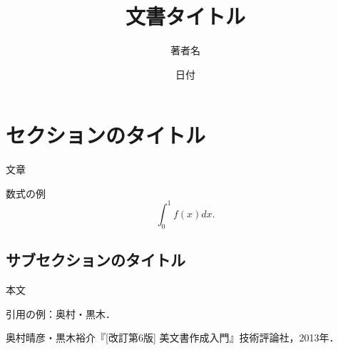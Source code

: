 \documentclass[11pt,a4j,fleqn]{jarticle}
\title{文書タイトル}
\author{著者名}
\date{日付}
\begin{document}
\maketitle

\section{セクションのタイトル}
文章

数式の例
\[
\int_0^1 f(x) dx.
\]

\subsection{サブセクションのタイトル}

本文

引用の例：奥村・黒木\cite{OkumuraKuroki13}．


\begin{thebibliography}{0}
奥村晴彦・黒木裕介『[改訂第6版] {\LaTeXe}美文書作成入門』技術評論社，2013年．
\end{thebibliography}
\end{document}
